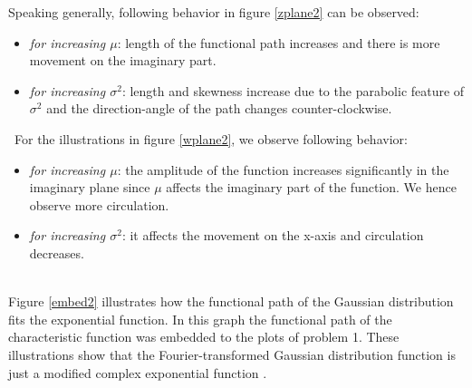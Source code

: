 \documentclass[a4paper,11pt]{article}
\begin{document}
Speaking generally, following behavior  in figure \ref{zplane2} can be observed:
\begin{itemize}
\item \textit{for increasing $\mu$}: length of the functional path increases and there is more movement on the imaginary part.
\item \textit{for increasing $\sigma^2$}: length and skewness increase due to the parabolic feature of $\sigma^2$ and the direction-angle of the path changes counter-clockwise.
\end{itemize}
\
For the illustrations in figure \ref{wplane2}, we observe following behavior: 
\begin{itemize}
\item \textit{for increasing $\mu$}: the amplitude of the function increases significantly in the imaginary plane since $\mu$ affects the imaginary part of the function. We hence observe more circulation.
\item \textit{for increasing $\sigma^2$}: it affects the movement on the x-axis and circulation decreases.
\end{itemize}
\
\\
Figure \ref{embed2} illustrates how the functional path of the Gaussian distribution fits the exponential function. In this graph the functional path of the characteristic function was embedded to the plots of problem 1. These illustrations show that the Fourier-transformed Gaussian distribution function is just a modified complex exponential function .
\newpage
\end{document}
